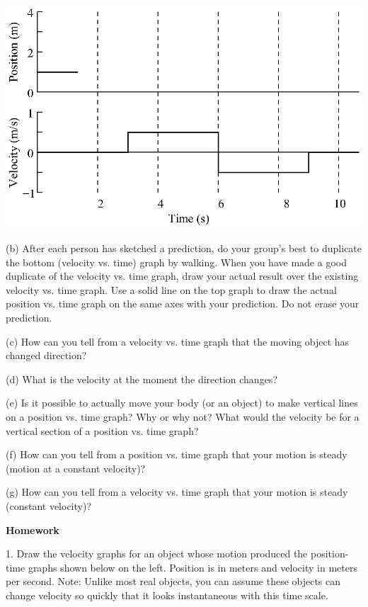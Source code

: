 \vspace{0.3cm}
{\par\centering \includegraphics{relating/relating_fig2.eps} \par}
\answerspace{0.3cm}

(b) After each person has sketched a prediction, do your group's best to duplicate the bottom (velocity vs. time) graph by walking. When you have made a good duplicate of the velocity vs. time graph, draw your actual result over the existing velocity vs. time graph. Use a solid line on the top graph to draw the actual position vs. time graph on the same axes with your prediction. Do not erase your prediction.

(c) How can you tell from a velocity vs. time graph that the moving object has
changed direction?
\answerspace{10mm}

(d) What is the velocity at the moment the direction changes? 
\answerspace{10mm}

(e) Is it possible to actually move your body (or an object) to make vertical
lines on a position vs. time graph? Why or why not? What would the velocity
be for a vertical section of a position vs. time graph? 
\answerspace{10mm}

(f) How can you tell from a position vs. time graph that your motion is steady
(motion at a constant velocity)? 
\answerspace{10mm}

\pagebreak[2]
(g) How can you tell from a velocity vs. time graph that your motion is steady
(constant velocity)? 
\answerspace{10mm}

\textbf{Homework} 

1. Draw the velocity graphs for an object whose motion produced the position-time
graphs shown below on the left. Position is in meters and velocity in meters
per second. Note: Unlike most real objects, you can assume these objects can
change velocity so quickly that it looks instantaneous with this time scale.

